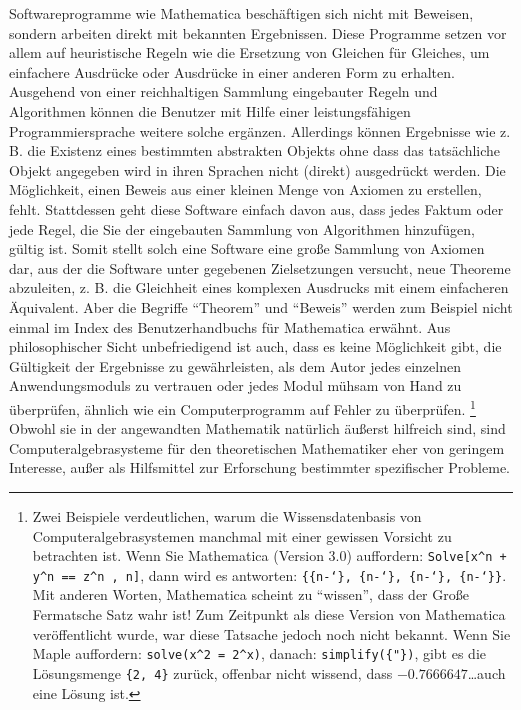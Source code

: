 Softwareprogramme wie Mathematica\cite{Wolfram} beschäftigen sich nicht mit Beweisen, sondern arbeiten direkt mit bekannten Ergebnissen.
Diese Programme setzen vor allem auf heuristische Regeln wie die Ersetzung von Gleichen für Gleiches, um einfachere Ausdrücke oder Ausdrücke in einer anderen Form zu erhalten.  Ausgehend von einer reichhaltigen Sammlung eingebauter Regeln und Algorithmen können die Benutzer mit Hilfe einer leistungsfähigen Programmiersprache weitere solche ergänzen.
Allerdings können Ergebnisse wie z. B. die Existenz eines bestimmten abstrakten Objekts ohne dass das tatsächliche Objekt angegeben wird in ihren Sprachen nicht (direkt) ausgedrückt werden.
Die Möglichkeit, einen Beweis aus einer kleinen Menge von Axiomen zu erstellen, fehlt.
Stattdessen geht diese Software einfach davon aus, dass jedes Faktum oder jede Regel, die Sie der eingebauten Sammlung von Algorithmen hinzufügen, gültig ist.  Somit stellt solch eine Software eine große Sammlung von Axiomen dar, aus der die Software unter gegebenen Zielsetzungen versucht, neue Theoreme abzuleiten, z. B. die Gleichheit eines komplexen Ausdrucks mit einem einfacheren Äquivalent. Aber die Begriffe "`Theorem"' und "`Beweis"' werden zum Beispiel nicht einmal im Index des Benutzerhandbuchs für Mathematica erwähnt.
Aus philosophischer Sicht unbefriedigend ist auch, dass es keine Möglichkeit gibt, die Gültigkeit der Ergebnisse zu gewährleisten, als dem Autor jedes einzelnen Anwendungsmoduls zu vertrauen oder jedes Modul mühsam von Hand zu überprüfen, ähnlich wie ein Computerprogramm auf Fehler zu überprüfen.
\footnote{Zwei Beispiele verdeutlichen, warum die Wissensdatenbasis von Computeralgebrasystemen manchmal mit einer gewissen Vorsicht zu betrachten ist.  Wenn Sie Mathematica (Version 3.0) auffordern: \texttt{Solve[x\^{ }n + y\^{ }n == z\^{ }n , n]}, dann wird es antworten: \texttt{\{\{n-\char`\}, \{n-\char`\}, \{n-\char`\}, \{n-\char`\}\}}. Mit anderen Worten, Mathematica scheint zu "`wissen"', dass der Große Fermatsche Satz wahr ist!  Zum Zeitpunkt als diese Version von Mathematica veröffentlicht wurde, war diese Tatsache jedoch noch nicht bekannt.
Wenn Sie Maple auffordern: \texttt{solve(x\^{ }2 = 2\^{ }x)}, danach: \texttt{simplify(\{"{}\})}, gibt es die Lösungsmenge \texttt{\{2, 4\}} zurück, offenbar nicht wissend, dass $-0.7666647$\ldots auch eine Lösung ist.}
Obwohl sie in der angewandten Mathematik natürlich äußerst hilfreich sind, sind Computeralgebrasysteme für den theoretischen Mathematiker eher von geringem Interesse, außer als Hilfsmittel zur Erforschung bestimmter spezifischer Probleme.

